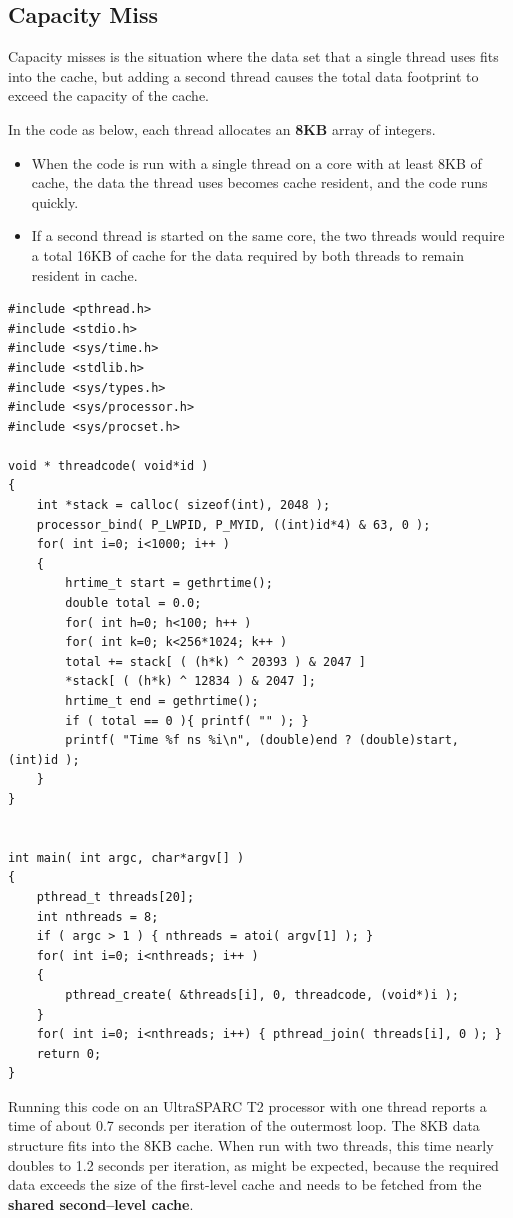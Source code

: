 \documentclass[12pt,a4paper]{report}
\begin{document}
\subsection{Capacity Miss}
Capacity misses is the situation where the data set that a single thread uses fits into the cache, but adding a second thread causes the total data footprint to exceed the capacity of the cache.
\par
In the code as below, each thread allocates an \textbf{8KB} array of integers.
\begin{itemize}
	\item When the code is run with a single thread on a core with at least 8KB of cache, the data the thread uses becomes cache resident, and the code runs quickly.
	\item If a second thread is started on the same core, the two threads would require a total 16KB of cache for the data required by both threads to remain resident in cache.
\end{itemize}
\begin{lstlisting}
#include <pthread.h>
#include <stdio.h>
#include <sys/time.h>
#include <stdlib.h>
#include <sys/types.h>
#include <sys/processor.h>
#include <sys/procset.h>

void * threadcode( void*id )
{
	int *stack = calloc( sizeof(int), 2048 );
	processor_bind( P_LWPID, P_MYID, ((int)id*4) & 63, 0 );
	for( int i=0; i<1000; i++ )
	{
		hrtime_t start = gethrtime();
		double total = 0.0;
		for( int h=0; h<100; h++ )
		for( int k=0; k<256*1024; k++ )
		total += stack[ ( (h*k) ^ 20393 ) & 2047 ]
		*stack[ ( (h*k) ^ 12834 ) & 2047 ];
		hrtime_t end = gethrtime();
		if ( total == 0 ){ printf( "" ); }
		printf( "Time %f ns %i\n", (double)end ? (double)start, (int)id );
	}
}


int main( int argc, char*argv[] )
{
	pthread_t threads[20];
	int nthreads = 8;
	if ( argc > 1 ) { nthreads = atoi( argv[1] ); }
	for( int i=0; i<nthreads; i++ )
	{
		pthread_create( &threads[i], 0, threadcode, (void*)i );
	}
	for( int i=0; i<nthreads; i++) { pthread_join( threads[i], 0 ); }
	return 0;
}
\end{lstlisting}
Running this code on an UltraSPARC T2 processor with one thread reports a time of about 0.7 seconds per iteration of the outermost loop. The 8KB data structure fits into the 8KB cache. When run with two threads, this time nearly doubles to 1.2 seconds per iteration, as might be expected, because the required data exceeds the size of the first-level cache and needs to be fetched from the \textbf{shared second--level cache}.
\end{document}
